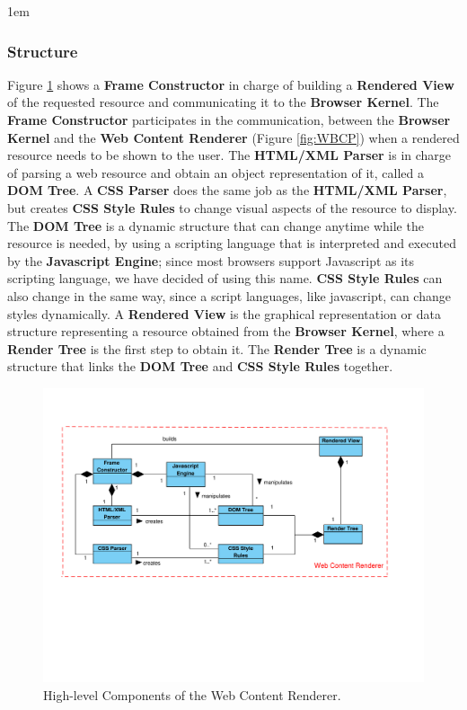 \documentclass[prodmode,acmtecs]{acmsmall}
\begin{document}

    \leftskip1em

    \subsubsection*{Structure}
    Figure \ref{fig:WCR} shows a \textbf{Frame Constructor} in charge of building a \textbf{Rendered View} of the requested resource and communicating it to the \textbf{Browser Kernel}. The \textbf{Frame Constructor} participates in the communication, between the \textbf{Browser Kernel} and the \textbf{Web Content Renderer} (Figure \ref{fig:WBCP}) when a rendered resource needs to be shown to the user. The \textbf{HTML/XML Parser} is in charge of parsing a web resource and obtain an object representation of it, called a \textbf{DOM Tree}. A \textbf{CSS Parser} does the same job as the \textbf{HTML/XML Parser}, but creates \textbf{CSS Style Rules} to change visual aspects of the resource to display. The \textbf{DOM Tree} is a dynamic structure that can change anytime while the resource is needed, by using a scripting language that is interpreted and executed by the \textbf{Javascript Engine}; since most browsers support Javascript as its scripting language, we have decided of using this name. \textbf{CSS Style Rules} can also change in the same way, since a script languages, like javascript, can change styles dynamically. A \textbf{Rendered View} is the graphical representation or data structure representing a resource obtained from the \textbf{Browser Kernel}, where a \textbf{Render Tree} is the first step to obtain it. The \textbf{Render Tree} is a dynamic structure that links the \textbf{DOM Tree} and \textbf{CSS Style Rules} together.

    \begin{figure}[h!t]
      \vspace*{-1cm}
      \centering
      \hspace*{-0.4cm}\includegraphics[scale=0.57]{figures/WebContentRenderer-v2.pdf}
      \vspace*{-4cm}
      \caption{High-level Components of the Web Content Renderer.}
      \label{fig:WCR}
    \end{figure}
\end{document}
